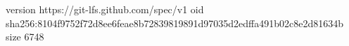 version https://git-lfs.github.com/spec/v1
oid sha256:8104f9752f72d8ee6feae8b72839819891d97035d2edffa491b02c8e2d81634b
size 6748

